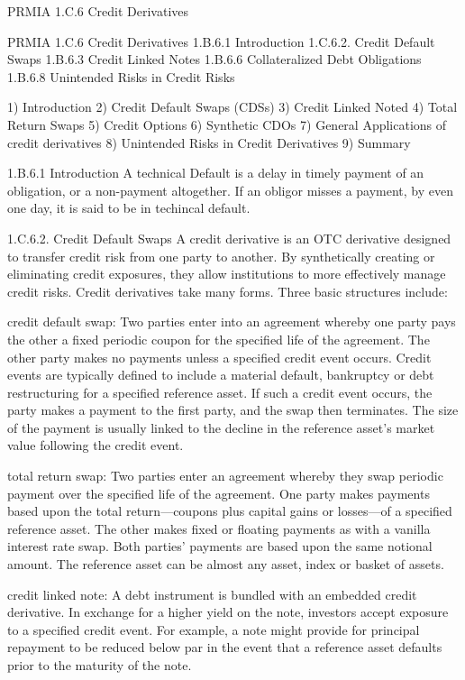 PRMIA 1.C.6 Credit Derivatives 

PRMIA 1.C.6 Credit Derivatives
1.B.6.1 Introduction
1.C.6.2. Credit Default Swaps
1.B.6.3 Credit Linked Notes
1.B.6.6 Collateralized Debt Obligations
1.B.6.8 Unintended Risks in Credit Risks

1) Introduction
2) Credit Default Swaps (CDSs)
3) Credit Linked Noted
4) Total Return Swaps
5) Credit Options
6) Synthetic CDOs
7) General Applications of credit derivatives
8) Unintended Risks in Credit Derivatives
9) Summary

1.B.6.1 Introduction
A technical Default is a delay in timely payment of an obligation, or a non-payment altogether.
If an obligor misses a payment, by even one day, it is said to be in techincal default.


1.C.6.2. Credit Default Swaps 
A credit derivative is an OTC derivative designed to transfer credit risk from one party to another. By synthetically creating or eliminating credit exposures, they allow institutions to more effectively manage credit risks. Credit derivatives take many forms. Three basic structures include:

credit default swap: Two parties enter into an agreement whereby one party pays the other a fixed periodic coupon for the specified life of the agreement. The other party makes no payments unless a specified credit event occurs. Credit events are typically defined to include a material default, bankruptcy or debt restructuring for a specified reference asset. If such a credit event occurs, the party makes a payment to the first party, and the swap then terminates. The size of the payment is usually linked to the decline in the reference asset's market value following the credit event.

total return swap: Two parties enter an agreement whereby they swap periodic payment over the specified life of the agreement. One party makes payments based upon the total return—coupons plus capital gains or losses—of a specified reference asset. The other makes fixed or floating payments as with a vanilla interest rate swap. Both parties' payments are based upon the same notional amount. The reference asset can be almost any asset, index or basket of assets.
	
credit linked note: A debt instrument is bundled with an embedded credit derivative. In exchange for a higher yield on the note, investors accept exposure to a specified credit event. For example, a note might provide for principal repayment to be reduced below par in the event that a reference asset defaults prior to the maturity of the note.

